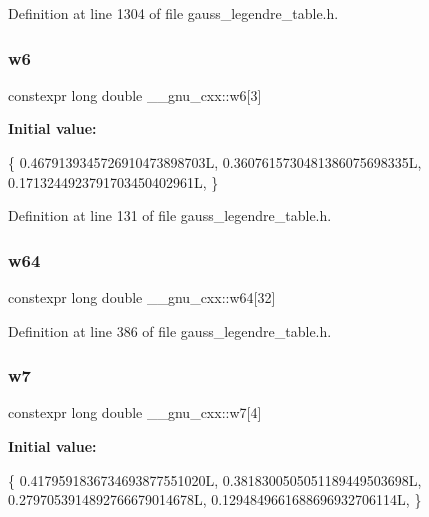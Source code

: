 Definition at line 1304 of file gauss\+\_\+legendre\+\_\+table.\+h.

\mbox{\label{namespace____gnu__cxx_a28b2300f8b7add692619c932d20498aa}} 
\subsubsection{\texorpdfstring{w6}{w6}}
{\footnotesize\ttfamily constexpr long double \+\_\+\+\_\+gnu\+\_\+cxx\+::w6\mbox{[}3\mbox{]}}

{\bfseries Initial value\+:}
\begin{DoxyCode}
\{
    0.4679139345726910473898703L,
    0.3607615730481386075698335L,
    0.1713244923791703450402961L,
  \}
\end{DoxyCode}


Definition at line 131 of file gauss\+\_\+legendre\+\_\+table.\+h.

\mbox{\label{namespace____gnu__cxx_aee2ad0b2f98e9f3210e7c3f3cedf2b3a}} 
\subsubsection{\texorpdfstring{w64}{w64}}
{\footnotesize\ttfamily constexpr long double \+\_\+\+\_\+gnu\+\_\+cxx\+::w64\mbox{[}32\mbox{]}}



Definition at line 386 of file gauss\+\_\+legendre\+\_\+table.\+h.

\mbox{\label{namespace____gnu__cxx_a82210f482d792394c592fd398294d6cb}} 
\subsubsection{\texorpdfstring{w7}{w7}}
{\footnotesize\ttfamily constexpr long double \+\_\+\+\_\+gnu\+\_\+cxx\+::w7\mbox{[}4\mbox{]}}

{\bfseries Initial value\+:}
\begin{DoxyCode}
\{
    0.4179591836734693877551020L,
    0.3818300505051189449503698L,
    0.2797053914892766679014678L,
    0.1294849661688696932706114L,
  \}
\end{DoxyCode}


